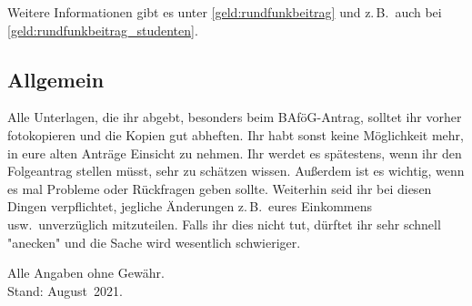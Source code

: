 \begin{multicols*}{2}
Weitere Informationen gibt es unter \cref{geld:rundfunkbeitrag} und z.\,B.\ auch bei \cref{geld:rundfunkbeitrag_studenten}.

\vspace{-2ex}

\subsection{Allgemein}
Alle Unterlagen, die ihr abgebt, besonders beim BAföG-Antrag, solltet ihr vorher fotokopieren und die Kopien gut abheften.
Ihr habt sonst keine Möglichkeit mehr, in eure alten Anträge Einsicht zu nehmen.
Ihr werdet es spätestens, wenn ihr den Folgeantrag stellen müsst, sehr zu schätzen wissen.
Außerdem ist es wichtig, wenn es mal Probleme oder Rückfragen geben sollte.
Weiterhin seid ihr bei diesen Dingen verpflichtet, jegliche Änderungen z.\,B.\ eures Einkommens usw.\ unverzüglich mitzuteilen.
Falls ihr dies nicht tut, dürftet ihr sehr schnell "anecken" und die Sache wird wesentlich schwieriger.

\begin{flushright}
	Alle Angaben ohne Gewähr.\\
	Stand: August~2021.
\end{flushright}

\vspace{-2ex}


\end{multicols*}
